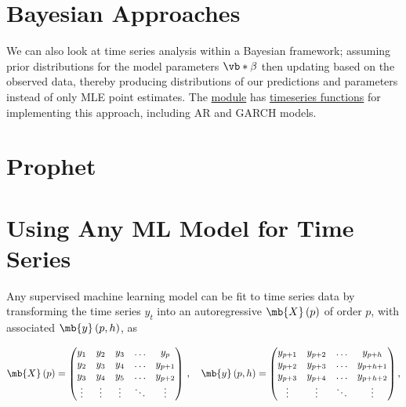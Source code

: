 \section{Bayesian Approaches}
\label{time_series:bayesian_approaches}

We can also look at time series analysis within a Bayesian framework;
assuming prior distributions for the model parameters $\vb*{\beta}$
then updating based on the observed data,
thereby producing distributions of our predictions and parameters instead of only MLE point estimates.
The \pymcThree \href{https://docs.pymc.io}{module}
has \href{https://docs.pymc.io/api/distributions/timeseries.html}{timeseries functions}
for implementing this approach, including AR and GARCH models.

\section{Prophet}
\label{time_series:prophet}

\cite{meta_prophet}

\section{Using Any ML Model for Time Series}
\label{time_series:any_ml}

Any supervised machine learning model can be fit to time series data
by transforming the time series $y_{t}$ into
an autoregressive $\mb{X}\left(p\right)$ of order $p$,
with associated $\mb{y}\left(p,h\right)$, as

\begin{align}\label{eq:any_ml:autoregressive_X}
  \mb{X}\left(p\right) = \begin{pmatrix}
    y_{1}  & y_{2}  & y_{3}  & \ldots & y_{p}   \\
    y_{2}  & y_{3}  & y_{4}  & \ldots & y_{p+1} \\
    y_{3}  & y_{4}  & y_{5}  & \ldots & y_{p+2} \\
    \vdots & \vdots & \vdots & \ddots & \vdots
  \end{pmatrix}\,,\quad
  \mb{y}\left(p,h\right) = \begin{pmatrix}
    y_{p+1} & y_{p+2} & \ldots & y_{p+h}   \\
    y_{p+2} & y_{p+3} & \ldots & y_{p+h+1} \\
    y_{p+3} & y_{p+4} & \ldots & y_{p+h+2} \\
    \vdots  & \vdots  & \ddots & \vdots
  \end{pmatrix},
\end{align}

